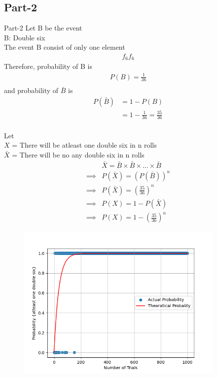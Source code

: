 \documentclass{beamer}
\begin{document}
\subsection{Part-2}
\begin{frame}{Part-2}
    Let B be the event \\
    B: Double six \\
    The event B consist of only one element \\
    \begin{align}
        f_6f_6
    \end{align}
    Therefore, probability of B is
    \begin{align}
        P(B) = \frac{1}{36} \\
    \end{align}
    and probability of $\bar{B}$ is 
    \begin{align}
        P(\bar{B}) &= 1 - P(B) \\
        &= 1 - \frac{1}{36} = \frac{35}{36} \\
    \end{align}
\end{frame}
\begin{frame}
    Let \\
    $X$ = There will be atleast one double six in n rolls \\
    $\bar{X}$ = There will be no any double six in n rolls
    \begin{align}
        &\bar{X} = \bar{B}\times\bar{B}\times...\times\bar{B} \\
        \implies &P(\bar{X}) = \left(P(\bar{B})\right)^n \\
        \implies &P(\bar{X}) = \left(\frac{35}{36}\right)^n \\
        \implies &P(X) = 1 - P(\bar{X}) \\
        \implies &P(X) = 1 - \left(\frac{35}{36}\right)^n
    \end{align}
\end{frame}
\begin{frame}
    \begin{figure}[!ht]
        \includegraphics[width=4in, height=3in]{Figures/Figure_2.png}
    \end{figure}
\end{frame}
\end{document}
